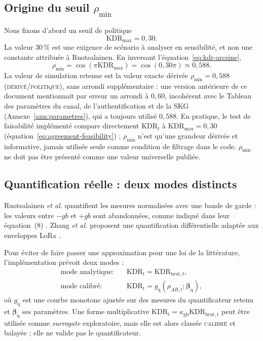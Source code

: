 \documentclass[conference,a4paper]{IEEEtran}
\newcommand{\statusDer}{\textsc{dérivé}}
\newcommand{\statusPol}{\textsc{politique}}
\newcommand{\statusCal}{\textsc{calibré}}
\newcommand{\KDR}{\mathrm{KDR}}
\begin{document}
\subsection{Origine du seuil $\rho_{\min}$}
Nous fixons d'abord un seuil de politique
\begin{equation}
    \KDR_{\max}=0{,}30.
    \label{eq:kdr-max-policy}
\end{equation}
La valeur $30\,\%$ est une exigence de scénario à analyser en sensibilité, et non une constante attribuée à Ruotsalainen. En inversant l'équation~\eqref{eq:kdr-arcsine},
\begin{equation}
    \rho_{\min}=\cos(\pi\KDR_{\max})
    =\cos(0{,}30\pi)\simeq0{,}588.
    \label{eq:rho-min-derived}
\end{equation}
La valeur de simulation retenue est la valeur exacte dérivée $\rho_{\min}=0{,}588$ (\statusDer{}/\statusPol{}), sans arrondi supplémentaire : une version antérieure de ce document mentionnait par erreur un arrondi à $0{,}60$, incohérent avec le Tableau des paramètres du canal, de l'authentification et de la SKG (Annexe~\ref{ann:parametres}), qui a toujours utilisé $0{,}588$. En pratique, le test de faisabilité implémenté compare directement $\KDR_t$ à $\KDR_{\max}=0{,}30$ (équation~\eqref{eq:agreement-feasibility}) ; $\rho_{\min}$ n'est qu'une grandeur dérivée et informative, jamais utilisée seule comme condition de filtrage dans le code. $\rho_{\min}$ ne doit pas être présenté comme une valeur universelle publiée.

\subsection{Quantification réelle : deux modes distincts}
Ruotsalainen \emph{et al.} quantifient les mesures normalisées avec une bande de garde : les valeurs entre $-gb$ et $+gb$ sont abandonnées, comme indiqué dans leur équation~(8) \cite[Eq.~(8)]{ruotsalainen2020}. Zhang \emph{et al.} proposent une quantification différentielle adaptée aux enveloppes LoRa \cite{zhang2018}.

Pour éviter de faire passer une approximation pour une loi de la littérature, l'implémentation prévoit deux modes :
\begin{align}
\text{mode analytique:}\quad &\KDR_t=\KDR_{\mathrm{brut},t},
\label{eq:kdr-mode-analytic}\\
\text{mode calibré:}\quad &\KDR_t=g_{\mathrm q}(\rho_{AB,t};\boldsymbol\beta_{\mathrm q}),
\label{eq:kdr-mode-calibrated}
\end{align}
où $g_{\mathrm q}$ est une courbe monotone ajustée sur des mesures du quantificateur retenu et $\boldsymbol\beta_{\mathrm q}$ ses paramètres. Une forme multiplicative $\KDR_t=\kappa_{\mathrm{gb}}\KDR_{\mathrm{brut},t}$ peut être utilisée comme \emph{surrogate} exploratoire, mais elle est alors classée \statusCal{} et balayée ; elle ne valide pas le quantificateur.
\end{document}
